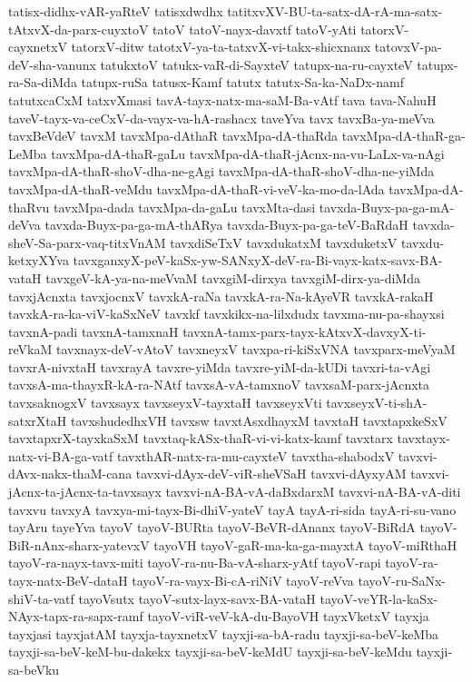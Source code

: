 {tatisx-didhx-vAR-yaRteV
tatisxdwdhx
tatitxvXV-BU-ta-satx-dA-rA-ma-satx-tAtxvX-da-parx-cuyxtoV
tatoV
tatoV-nayx-davxtf
tatoV-yAti
tatorxV-cayxnetxV
tatorxV-ditw
tatotxV-ya-ta-tatxvX-vi-takx-shicxnanx
tatovxV-pa-deV-sha-vanunx
tatukxtoV
tatukx-vaR-di-SayxteV
tatupx-na-ru-cayxteV
tatupx-ra-Sa-diMda
tatupx-ruSa
tatusx-Kamf
tatutx
tatutx-Sa-ka-NaDx-namf
tatutxcaCxM
tatxvXmasi
tavA-tayx-natx-ma-saM-Ba-vAtf
tava
tava-NahuH
taveV-tayx-va-ceCxV-da-vayx-va-hA-rashacx
taveYva
tavx
tavxBa-ya-meVva
tavxBeVdeV
tavxM
tavxMpa-dAthaR
tavxMpa-dA-thaRda
tavxMpa-dA-thaR-ga-LeMba
tavxMpa-dA-thaR-gaLu
tavxMpa-dA-thaR-jAcnx-na-vu-LaLx-va-nAgi
tavxMpa-dA-thaR-shoV-dha-ne-gAgi
tavxMpa-dA-thaR-shoV-dha-ne-yiMda
tavxMpa-dA-thaR-veMdu
tavxMpa-dA-thaR-vi-veV-ka-mo-da-lAda
tavxMpa-dA-thaRvu
tavxMpa-dada
tavxMpa-da-gaLu
tavxMta-dasi
tavxda-Buyx-pa-ga-mA-deVva
tavxda-Buyx-pa-ga-mA-thARya
tavxda-Buyx-pa-ga-teV-BaRdaH
tavxda-sheV-Sa-parx-vaq-titxVnAM
tavxdiSeTxV
tavxdukatxM
tavxduketxV
tavxdu-ketxyXYva
tavxganxyX-peV-kaSx-yw-SANxyX-deV-ra-Bi-vayx-katx-savx-BA-vataH
tavxgeV-kA-ya-na-meVvaM
tavxgiM-dirxya
tavxgiM-dirx-ya-diMda
tavxjAcnxta
tavxjocnxV
tavxkA-raNa
tavxkA-ra-Na-kAyeVR
tavxkA-rakaH
tavxkA-ra-ka-viV-kaSxNeV
tavxkf
tavxkikx-na-lilxdudx
tavxma-nu-pa-shayxsi
tavxnA-padi
tavxnA-tamxnaH
tavxnA-tamx-parx-tayx-kAtxvX-davxyX-ti-reVkaM
tavxnayx-deV-vAtoV
tavxneyxV
tavxpa-ri-kiSxVNA
tavxparx-meVyaM
tavxrA-nivxtaH
tavxrayA
tavxre-yiMda
tavxre-yiM-da-kUDi
tavxri-ta-vAgi
tavxsA-ma-thayxR-kA-ra-NAtf
tavxsA-vA-tamxnoV
tavxsaM-parx-jAcnxta
tavxsaknogxV
tavxsayx
tavxseyxV-tayxtaH
tavxseyxVti
tavxseyxV-ti-shA-satxrXtaH
tavxshudedhxVH
tavxsw
tavxtAsxdhayxM
tavxtaH
tavxtapxkeSxV
tavxtapxrX-tayxkaSxM
tavxtaq-kASx-thaR-vi-vi-katx-kamf
tavxtarx
tavxtayx-natx-vi-BA-ga-vatf
tavxthAR-natx-ra-mu-cayxteV
tavxtha-shabodxV
tavxvi-dAvx-nakx-thaM-cana
tavxvi-dAyx-deV-viR-sheVSaH
tavxvi-dAyxyAM
tavxvi-jAcnx-ta-jAcnx-ta-tavxsayx
tavxvi-nA-BA-vA-daBxdarxM
tavxvi-nA-BA-vA-diti
tavxvu
tavxyA
tavxya-mi-tayx-Bi-dhiV-yateV
tayA
tayA-ri-sida
tayA-ri-su-vano
tayAru
tayeYva
tayoV
tayoV-BURta
tayoV-BeVR-dAnanx
tayoV-BiRdA
tayoV-BiR-nAnx-sharx-yatevxV
tayoVH
tayoV-gaR-ma-ka-ga-mayxtA
tayoV-miRthaH
tayoV-ra-nayx-tavx-miti
tayoV-ra-nu-Ba-vA-sharx-yAtf
tayoV-rapi
tayoV-ra-tayx-natx-BeV-dataH
tayoV-ra-vayx-Bi-cA-riNiV
tayoV-reVva
tayoV-ru-SaNx-shiV-ta-vatf
tayoVsutx
tayoV-sutx-layx-savx-BA-vataH
tayoV-veYR-la-kaSx-NAyx-tapx-ra-sapx-ramf
tayoV-viR-veV-kA-du-BayoVH
tayxVketxV
tayxja
tayxjasi
tayxjatAM
tayxja-tayxnetxV
tayxji-sa-bA-radu
tayxji-sa-beV-keMba
tayxji-sa-beV-keM-bu-dakekx
tayxji-sa-beV-keMdU
tayxji-sa-beV-keMdu
tayxji-sa-beVku
}
